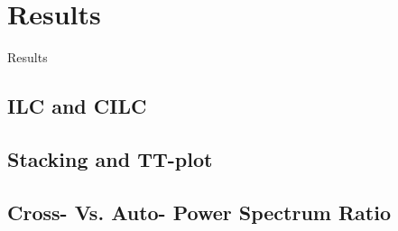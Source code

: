 
\chapter{Results} \label{sec:results}


Results

\section{ILC and CILC}

\section{Stacking and TT-plot}

\section{Cross- Vs. Auto- Power Spectrum Ratio}

